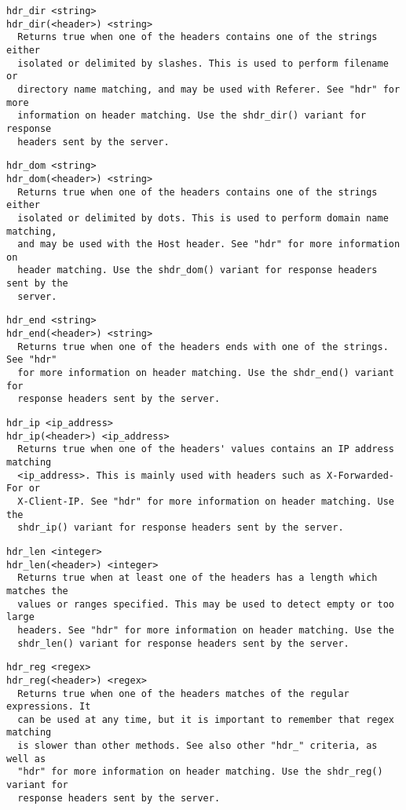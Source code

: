 \begin{verbatim}
hdr_dir <string>
hdr_dir(<header>) <string>
  Returns true when one of the headers contains one of the strings either
  isolated or delimited by slashes. This is used to perform filename or
  directory name matching, and may be used with Referer. See "hdr" for more
  information on header matching. Use the shdr_dir() variant for response
  headers sent by the server.
\end{verbatim}

\begin{verbatim}
hdr_dom <string>
hdr_dom(<header>) <string>
  Returns true when one of the headers contains one of the strings either
  isolated or delimited by dots. This is used to perform domain name matching,
  and may be used with the Host header. See "hdr" for more information on
  header matching. Use the shdr_dom() variant for response headers sent by the
  server.
\end{verbatim}

\begin{verbatim}
hdr_end <string>
hdr_end(<header>) <string>
  Returns true when one of the headers ends with one of the strings. See "hdr"
  for more information on header matching. Use the shdr_end() variant for
  response headers sent by the server.
\end{verbatim}

\begin{verbatim}
hdr_ip <ip_address>
hdr_ip(<header>) <ip_address>
  Returns true when one of the headers' values contains an IP address matching
  <ip_address>. This is mainly used with headers such as X-Forwarded-For or
  X-Client-IP. See "hdr" for more information on header matching. Use the
  shdr_ip() variant for response headers sent by the server.
\end{verbatim}

\begin{verbatim}
hdr_len <integer>
hdr_len(<header>) <integer>
  Returns true when at least one of the headers has a length which matches the
  values or ranges specified. This may be used to detect empty or too large
  headers. See "hdr" for more information on header matching. Use the
  shdr_len() variant for response headers sent by the server.
\end{verbatim}

\begin{verbatim}
hdr_reg <regex>
hdr_reg(<header>) <regex>
  Returns true when one of the headers matches of the regular expressions. It
  can be used at any time, but it is important to remember that regex matching
  is slower than other methods. See also other "hdr_" criteria, as well as
  "hdr" for more information on header matching. Use the shdr_reg() variant for
  response headers sent by the server.
\end{verbatim}


